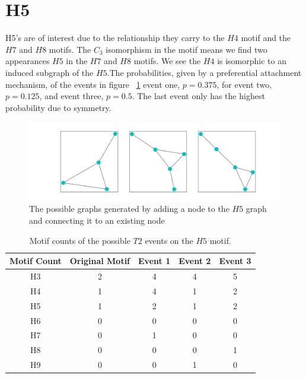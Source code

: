 \FloatBarrier


\section{H5}
H5's are of interest due to the relationship they carry to the $H4$ motif and the 
$H7$ and $H8$ motifs. The $C_3$ isomorphism in the motif means we find two appearances
$H5$ in the $H7$ and $H8$ motifs. We 
 see the $H4$ is isomorphic to an induced subgraph of the $H5$.The probabilities, given by 
 a preferential attachment mechanism, of the events
  in figure ~\ref{fig:H5T2} event one, $p=0.375$, for event two, $p=0.125$, and event three, $p=0.5$. The last event
only has the highest probability due to symmetry.

\begin{figure}[!ht]
    \includegraphics[width=12cm]{Images/H5_evolution.png}
    \centering
    \caption{The possible graphs generated by adding a node to the $H5$ graph 
    and connecting it to an existing node}
    \label{fig:H5T2}
\end{figure}
\FloatBarrier

\begin{table}
    \centering
    \begin{tabular}{||c c c c c||} 
    \hline
    Motif Count & Original Motif & Event 1 & Event 2 & Event 3\\ [0.5ex] 
    \hline\hline
    H3 & 2 & 4 & 4 & 5\\ 
    \hline
    H4 & 1 & 4 & 1 & 2\\
    \hline
    H5 & 1 & 2 & 1 & 2\\
    \hline
    H6 & 0 & 0 & 0 & 0 \\
    \hline
    H7 & 0 & 1 & 0 & 0 \\
    \hline
    H8 & 0 & 0 & 0 & 1\\
    \hline
    H9 & 0 & 0 & 1 & 0\\
    \hline
   \end{tabular}
   \caption{Motif counts of the possible $T2$ events on the $H5$ motif.}
    \label{table:3}
\end{table}


